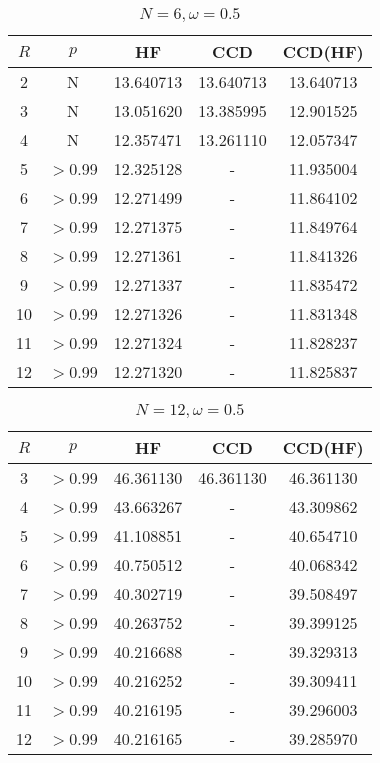     \begin{table}[H]
    \centering
    \caption{$N = 6, \omega = 0.5$}
    \begin{tabular}{ccccc}
    \toprule
    $R$ & $p$ & HF & CCD & CCD(HF) \\
    \midrule
    2 & N & 13.640713 & 13.640713 & 13.640713 \\
    3 & N & 13.051620 & 13.385995 & 12.901525 \\
    4 & N & 12.357471 & 13.261110 & 12.057347 \\
    5 & $>$0.99 & 12.325128 & - & 11.935004 \\
    6 & $>$0.99 & 12.271499 & - & 11.864102 \\
    7 & $>$0.99 & 12.271375 & - & 11.849764 \\
    8 & $>$0.99 & 12.271361 & - & 11.841326 \\
    9 & $>$0.99 & 12.271337 & - & 11.835472 \\
    10 & $>$0.99 & 12.271326 & - & 11.831348 \\
    11 & $>$0.99 & 12.271324 & - & 11.828237 \\
    12 & $>$0.99 & 12.271320 & - & 11.825837 \\
    \bottomrule
    \end{tabular}
\end{table}
    
    \begin{table}[H]
    \centering
    \caption{$N = 12, \omega = 0.5$}
    \begin{tabular}{ccccc}
    \toprule
    $R$ & $p$ & HF & CCD & CCD(HF) \\
    \midrule
    3 & $>$0.99 & 46.361130 & 46.361130 & 46.361130 \\
    4 & $>$0.99 & 43.663267 & - & 43.309862 \\
    5 & $>$0.99 & 41.108851 & - & 40.654710 \\
    6 & $>$0.99 & 40.750512 & - & 40.068342 \\
    7 & $>$0.99 & 40.302719 & - & 39.508497 \\
    8 & $>$0.99 & 40.263752 & - & 39.399125 \\
    9 & $>$0.99 & 40.216688 & - & 39.329313 \\
    10 & $>$0.99 & 40.216252 & - & 39.309411 \\
    11 & $>$0.99 & 40.216195 & - & 39.296003 \\
    12 & $>$0.99 & 40.216165 & - & 39.285970 \\
    \bottomrule
    \end{tabular}
\end{table}
    
